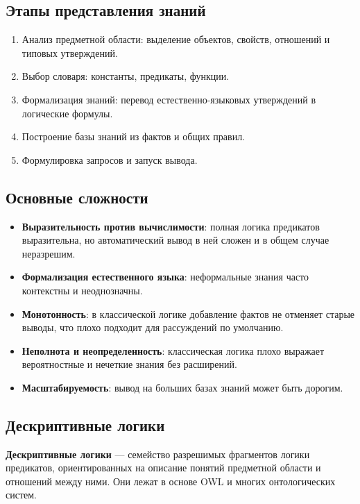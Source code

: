 \subsection*{Этапы представления знаний}

\begin{enumerate}
    \item Анализ предметной области: выделение объектов, свойств, отношений и типовых утверждений.
    \item Выбор словаря: константы, предикаты, функции.
    \item Формализация знаний: перевод естественно-языковых утверждений в логические формулы.
    \item Построение базы знаний из фактов и общих правил.
    \item Формулировка запросов и запуск вывода.
\end{enumerate}

\subsection*{Основные сложности}

\begin{itemize}
    \item \textbf{Выразительность против вычислимости}: полная логика предикатов выразительна, но автоматический вывод в ней сложен и в общем случае неразрешим.
    \item \textbf{Формализация естественного языка}: неформальные знания часто контекстны и неоднозначны.
    \item \textbf{Монотонность}: в классической логике добавление фактов не отменяет старые выводы, что плохо подходит для рассуждений по умолчанию.
    \item \textbf{Неполнота и неопределенность}: классическая логика плохо выражает вероятностные и нечеткие знания без расширений.
    \item \textbf{Масштабируемость}: вывод на больших базах знаний может быть дорогим.
\end{itemize}

\subsection*{Дескриптивные логики}

\textbf{Дескриптивные логики} --- семейство разрешимых фрагментов логики предикатов, ориентированных на описание понятий предметной области и отношений между ними. Они лежат в основе OWL и многих онтологических систем.

